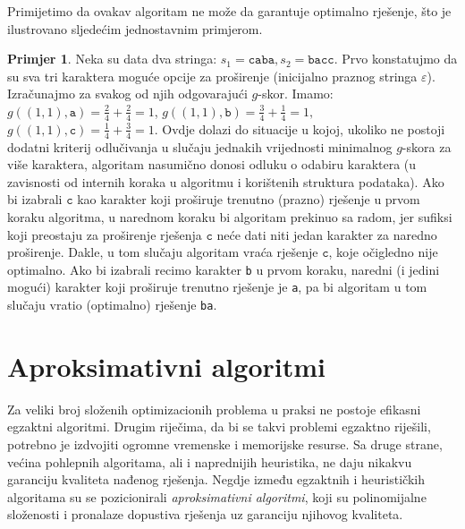 \documentclass[b5paper, utf8, 11pt, colorlinks]{book}
\theoremstyle{definition}
\newtheorem{primjer}{Primjer}[chapter]
\begin{document}
Primijetimo da ovakav algoritam ne može da garantuje optimalno rješenje, što je ilustrovano sljedećim jednostavnim primjerom. 

\begin{primjer} Neka su data dva stringa: $s_1 = \texttt{caba}, s_2 = \texttt{bacc}$. Prvo konstatujmo da su sva tri karaktera moguće opcije za proširenje (inicijalno praznog stringa $\varepsilon$). Izračunajmo za svakog od njih odgovarajući $g$-skor. Imamo: $g((1,1), \texttt{a}) = \frac{2}{4} + \frac{2}{4}= 1$, $g((1, 1), \texttt{b}) = \frac{3}{4} + \frac{1}{4}=1,$ $g((1,1), \texttt{c}) = \frac{1}{4} + \frac{3}{4} = 1$. Ovdje dolazi do situacije u kojoj, ukoliko ne postoji dodatni kriterij odlučivanja u slučaju jednakih vrijednosti minimalnog $g$-skora za više karaktera, algoritam nasumično donosi odluku o odabiru karaktera (u zavisnosti od internih koraka u algoritmu i korištenih struktura podataka). 
	Ako bi izabrali $\texttt{c}$ kao karakter koji proširuje trenutno (prazno) rješenje u prvom koraku algoritma, u narednom koraku bi algoritam prekinuo sa radom, jer sufiksi koji preostaju za proširenje rješenja $\texttt{c}$ neće dati niti jedan karakter za naredno proširenje.  Dakle, u tom slučaju algoritam vraća rješenje $\texttt{c}$, koje očigledno nije optimalno. Ako bi izabrali recimo karakter \texttt{b} u prvom koraku, naredni (i jedini mogući) karakter koji proširuje trenutno rješenje je \texttt{a}, pa bi algoritam  u tom slučaju vratio (optimalno) rješenje \texttt{ba}. 
	\end{primjer}

\section{Aproksimativni algoritmi} 
  
   Za veliki broj složenih optimizacionih problema u praksi ne postoje efikasni egzaktni algoritmi. Drugim riječima, da bi se takvi problemi egzaktno riješili, potrebno je izdvojiti ogromne vremenske i memorijske resurse. Sa druge strane, većina pohlepnih algoritama, ali i naprednijih heuristika, ne daju nikakvu garanciju  kvaliteta nađenog rješenja. Negdje između egzaktnih i heurističkih algoritama su se pozicionirali \emph{aproksimativni algoritmi}, koji su polinomijalne složenosti i pronalaze dopustiva rješenja uz garanciju  njihovog kvaliteta. 
  
\end{document}
